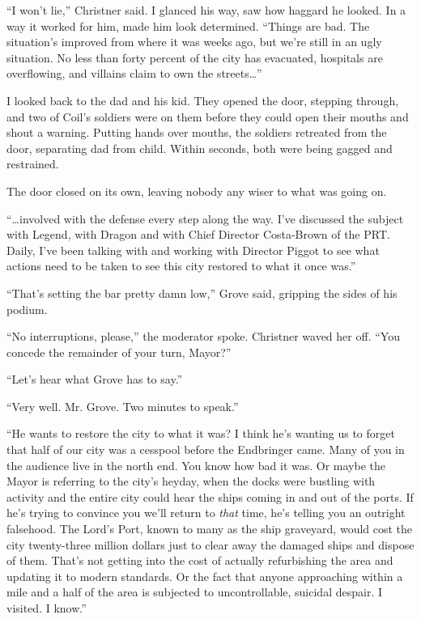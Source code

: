 ``I won't lie,'' Christner said.  I glanced his way, saw how haggard he looked.  In a way it worked for him, made him look determined.  ``Things are bad.  The situation's improved from where it was weeks ago, but we're still in an ugly situation.  No less than forty percent of the city has evacuated, hospitals are overflowing, and villains claim to own the streets\ldots''



I looked back to the dad and his kid.  They opened the door, stepping through, and two of Coil's soldiers were on them before they could open their mouths and shout a warning.  Putting hands over mouths, the soldiers retreated from the door, separating dad from child.  Within seconds, both were being gagged and restrained.



The door closed on its own, leaving nobody any wiser to what was going on.



``\ldots{}involved with the defense every step along the way.  I've discussed the subject with Legend, with Dragon and with Chief Director Costa-Brown of the PRT.  Daily, I've been talking with and working with Director Piggot to see what actions need to be taken to see this city restored to what it once was.''



``That's setting the bar pretty damn low,'' Grove said, gripping the sides of his podium.



``No interruptions, please,'' the moderator spoke.  Christner waved her off.  ``You concede the remainder of your turn, Mayor?''



``Let's hear what Grove has to say.''



``Very well.  Mr. Grove.  Two minutes to speak.''



``He wants to restore the city to what it was?  I think he's wanting us to forget that half of our city was a cesspool before the Endbringer came.  Many of you in the audience live in the north end.  You know how bad it was.  Or maybe the Mayor is referring to the city's heyday, when the docks were bustling with activity and the entire city could hear the ships coming in and out of the ports.  If he's trying to convince you we'll return to \emph{that} time, he's telling you an outright falsehood.  The Lord's Port, known to many as the ship graveyard, would cost the city twenty-three million dollars just to clear away the damaged ships and dispose of them.    That's not getting into the cost of actually refurbishing the area and updating it to modern standards.  Or the fact that anyone approaching within a mile and a half of the area is subjected to uncontrollable, suicidal despair.  I visited.  I know.''



